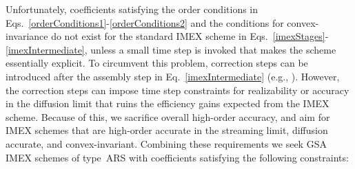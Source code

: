 Unfortunately, coefficients satisfying the order conditions in Eqs.~\eqref{orderConditions1}-\eqref{orderConditions2} and the conditions for convex-invariance do not exist for the standard IMEX scheme in Eqs.~\eqref{imexStages}-\eqref{imexIntermediate}, unless a small time step is invoked that makes the scheme essentially explicit.  
To circumvent this problem, correction steps can be introduced after the assembly step in Eq.~\eqref{imexIntermediate} (e.g., \cite{chertock_etal_2015,hu_etal_2018}).  
However, the correction steps can impose time step constraints for realizability or accuracy in the diffusion limit that ruins the efficiency gains expected from the IMEX scheme.  
Because of this, we sacrifice overall high-order accuracy, and aim for IMEX schemes that are high-order accurate in the streaming limit, diffusion accurate, and convex-invariant.  
Combining these requirements we seek GSA IMEX schemes of type~ARS with coefficients satisfying the following constraints:
